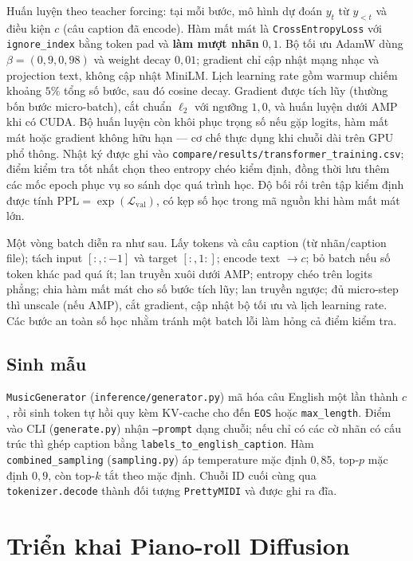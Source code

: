 Huấn luyện theo teacher forcing: tại mỗi bước, mô hình dự đoán $y_t$ từ $y_{<t}$ và điều kiện $c$ (câu caption đã encode). Hàm mất mát là \texttt{CrossEntropyLoss} với \texttt{ignore\_index} bằng token pad và \textbf{làm mượt nhãn} $0{,}1$. Bộ tối ưu AdamW dùng $\beta=(0{,}9,0{,}98)$ và weight decay $0{,}01$; gradient chỉ cập nhật mạng nhạc và projection text, không cập nhật MiniLM. Lịch learning rate gồm warmup chiếm khoảng $5\%$ tổng số bước, sau đó cosine decay. Gradient được tích lũy (thường bốn bước micro-batch), cắt chuẩn $\ell_2$ với ngưỡng $1{,}0$, và huấn luyện dưới AMP khi có CUDA. Bộ huấn luyện còn khôi phục trọng số nếu gặp logits, hàm mất mát hoặc gradient không hữu hạn --- cơ chế thực dụng khi chuỗi dài trên GPU phổ thông. Nhật ký được ghi vào \texttt{compare/results/transformer\_training.csv}; điểm kiểm tra tốt nhất chọn theo entropy chéo kiểm định, đồng thời lưu thêm các mốc epoch phục vụ so sánh dọc quá trình học. Độ bối rối trên tập kiểm định được tính $\mathrm{PPL}=\exp(\mathcal{L}_{\mathrm{val}})$, có kẹp số học trong mã nguồn khi hàm mất mát lớn.

Một vòng batch diễn ra như sau. Lấy tokens và câu caption (từ nhãn/caption file); tách input $[:,:-1]$ và target $[:,1:]$; encode text $\rightarrow c$; bỏ batch nếu số token khác pad quá ít; lan truyền xuôi dưới AMP; entropy chéo trên logits phẳng; chia hàm mất mát cho số bước tích lũy; lan truyền ngược; đủ micro-step thì unscale (nếu AMP), cắt gradient, cập nhật bộ tối ưu và lịch learning rate. Các bước an toàn số học nhằm tránh một batch lỗi làm hỏng cả điểm kiểm tra.

\subsection{Sinh mẫu}

\texttt{MusicGenerator} (\texttt{inference/generator.py}) mã hóa câu English một lần thành $c$, rồi sinh token tự hồi quy kèm KV-cache cho đến \texttt{EOS} hoặc \texttt{max\_length}. Điểm vào CLI (\texttt{generate.py}) nhận \texttt{--prompt} dạng chuỗi; nếu chỉ có các cờ nhãn có cấu trúc thì ghép caption bằng \texttt{labels\_to\_english\_caption}. Hàm \texttt{combined\_sampling} (\texttt{sampling.py}) áp temperature mặc định $0{,}85$, top-$p$ mặc định $0{,}9$, còn top-$k$ tắt theo mặc định. Chuỗi ID cuối cùng qua \texttt{tokenizer.decode} thành đối tượng \texttt{PrettyMIDI} và được ghi ra đĩa.

\section{Triển khai Piano-roll Diffusion}
\label{sec:ch3-diffusion}

